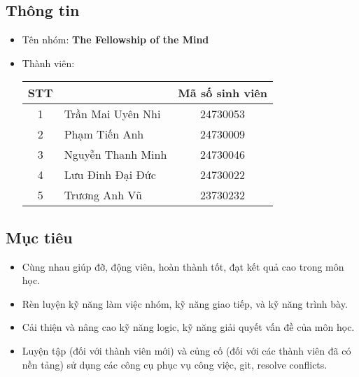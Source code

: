 \documentclass[a4paper, 12pt]{article}
\begin{document}
\subsection{Thông tin}
\renewcommand{\arraystretch}{1.5}
\begin{itemize}
    \item Tên nhóm: \large \textbf{The Fellowship of the Mind}
    \item Thành viên:
    \begin{table}[h]
        \centering
        \begin{tabular}{|c|>{\raggedright\arraybackslash}p{5cm}|c|}
            \hline
            \textbf{STT} & \multicolumn{1}{c|}{\textbf{Tên}} & \textbf{Mã số sinh viên} \\
            \hline
            1 & Trần Mai Uyên Nhi & 24730053 \\
            \hline
            2 & Phạm Tiến Anh & 24730009 \\
            \hline
            3 & Nguyễn Thanh Minh & 24730046 \\
            \hline
            4 & Lưu Đinh Đại Đức & 24730022 \\
            \hline
            5 & Trương Anh Vũ & 23730232 \\
            \hline
        \end{tabular}
\end{table}
\end{itemize}

\subsection{Mục tiêu}
\begin{itemize}
    \item Cùng nhau giúp đỡ, động viên, hoàn thành tốt, đạt kết quả cao trong môn học.
    \item Rèn luyện kỹ năng làm việc nhóm, kỹ năng giao tiếp, và kỹ năng trình bày.
    \item Cải thiện và nâng cao kỹ năng logic, kỹ năng giải quyết vấn đề của môn học.
    \item Luyện tập (đối với thành viên mới) và củng cố (đối với các thành viên đã có nền tảng) sử dụng các công cụ phục vụ công việc, git, resolve conflicts.
\end{itemize}
\end{document}
